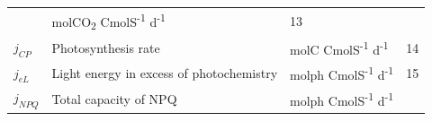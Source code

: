 \documentclass[]{elsarticle} %
\begin{document}
\begin{longtable}[c]{@{}llll@{}}
\begin{minipage}[t]{0.48\columnwidth}
\strut\end{minipage} &
\begin{minipage}[t]{0.25\columnwidth}\raggedright\strut
molCO\textsubscript{2} CmolS\textsuperscript{-1} d\textsuperscript{-1}
\strut\end{minipage} &
\begin{minipage}[t]{0.10\columnwidth}\raggedright\strut
13
\strut\end{minipage}\tabularnewline
\begin{minipage}[t]{0.10\columnwidth}\raggedright\strut
\(j_{CP}\)
\strut\end{minipage} &
\begin{minipage}[t]{0.48\columnwidth}\raggedright\strut
Photosynthesis rate
\strut\end{minipage} &
\begin{minipage}[t]{0.25\columnwidth}\raggedright\strut
molC CmolS\textsuperscript{-1} d\textsuperscript{-1}
\strut\end{minipage} &
\begin{minipage}[t]{0.10\columnwidth}\raggedright\strut
14
\strut\end{minipage}\tabularnewline
\begin{minipage}[t]{0.10\columnwidth}\raggedright\strut
\(j_{eL}\)
\strut\end{minipage} &
\begin{minipage}[t]{0.48\columnwidth}\raggedright\strut
Light energy in excess of photochemistry
\strut\end{minipage} &
\begin{minipage}[t]{0.25\columnwidth}\raggedright\strut
molph CmolS\textsuperscript{-1} d\textsuperscript{-1}
\strut\end{minipage} &
\begin{minipage}[t]{0.10\columnwidth}\raggedright\strut
15
\strut\end{minipage}\tabularnewline
\begin{minipage}[t]{0.10\columnwidth}\raggedright\strut
\(j_{NPQ}\)
\strut\end{minipage} &
\begin{minipage}[t]{0.48\columnwidth}\raggedright\strut
Total capacity of NPQ
\strut\end{minipage} &
\begin{minipage}[t]{0.25\columnwidth}\raggedright\strut
molph CmolS\textsuperscript{-1} d\textsuperscript{-1}
\strut\end{minipage} &
\begin{minipage}[t]{0.10\columnwidth}\raggedright\strut

\end{minipage}
\end{longtable}
\end{document}
